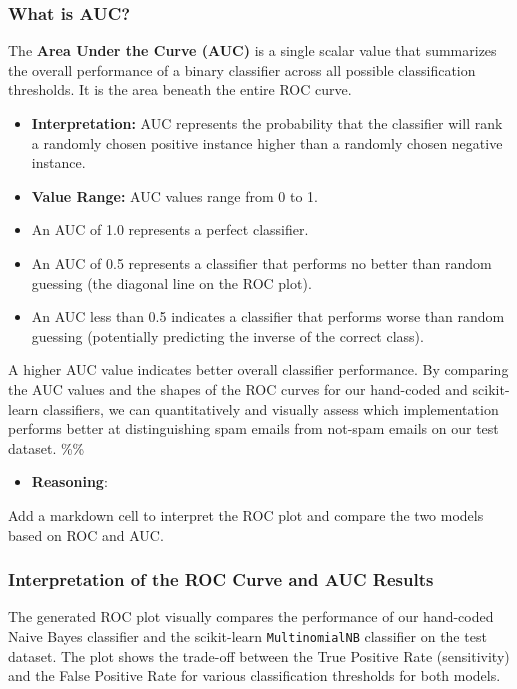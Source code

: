 \documentclass[12pt,a4paper]{article}
\begin{document}
\subsubsection{What is AUC?}

The \textbf{Area Under the Curve (AUC)} is a single scalar value that summarizes the overall performance of a binary classifier across all possible classification thresholds. It is the area beneath the entire ROC curve.

\begin{itemize}
    \item \textbf{Interpretation:} AUC represents the probability that the classifier will rank a randomly chosen positive instance higher than a randomly chosen negative instance.
    \item \textbf{Value Range:} AUC values range from 0 to 1.
    \item An AUC of 1.0 represents a perfect classifier.
    \item An AUC of 0.5 represents a classifier that performs no better than random guessing (the diagonal line on the ROC plot).
    \item An AUC less than 0.5 indicates a classifier that performs worse than random guessing (potentially predicting the inverse of the correct class).
\end{itemize}

A higher AUC value indicates better overall classifier performance. By comparing the AUC values and the shapes of the ROC curves for our hand-coded and scikit-learn classifiers, we can quantitatively and visually assess which implementation performs better at distinguishing spam emails from not-spam emails on our test dataset.
\%\%


\begin{itemize}
    \item \textbf{Reasoning}:
\end{itemize}

Add a markdown cell to interpret the ROC plot and compare the two models based on ROC and AUC.



\subsubsection{Interpretation of the ROC Curve and AUC Results}

The generated ROC plot visually compares the performance of our hand-coded Naive Bayes classifier and the scikit-learn \texttt{MultinomialNB} classifier on the test dataset. The plot shows the trade-off between the True Positive Rate (sensitivity) and the False Positive Rate for various classification thresholds for both models.
\end{document}
